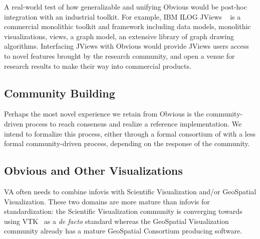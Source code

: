A real-world test of how generalizable and unifying Obvious would be
post-hoc integration with an industrial toolkit.  For example,
IBM ILOG JViews ~\cite{JViews} is a commercial monolithic toolkit and
framework including data models, monolithic visualizations, views, a
graph model, an extensive library of graph drawing algorithms.
Interfacing JViews with Obvious would provide JViews users
access to novel features brought by the research community, and open a
venue for research results to make their way into commercial products.

\subsection{Community Building}

Perhaps the most novel experience we retain from Obvious is the
community-driven process to reach consensus and realize a reference
implementation.  We intend to formalize this process, either through a
formal consortium of with a less formal community-driven process,
depending on the response of the community.

\begin{comment}
 experiment on various means to carry this
community-driven consensus building, to see how it can help
consolidate acquired experience in the craft of toolkit design.


In many respects, this process is akin to a
standardization process, only it lacks the industry incentive and
backing. Like open source projects, we shall only count on voluntary
contributions (aside partial of funding from public research grants),
only, in the present state of toolkits, it is much more tempting to
devise and expand one's own toolkit than contribute and make
compromise to use a shared design which still lacks serious adoption.


As an afterthought, we find such consolidation effort is rarely found
in research domains, and yet should surely help make the field more
visible and readable from an outsider perspective.
\end{comment}

\subsection{Obvious and Other Visualizations}

VA often needs to combine infovis with Scientific
Visualization and/or GeoSpatial Visualization.  These two domains are
more mature than infovis for standardization: the Scientific
Visualization community is converging towards using VTK~\cite{VTK} as
a \textit{de facto} standard whereas the GeoSpatial Visualization
community already has a mature GeoSpatial Consortium producing
software\cite{OpenGeospatial}.

